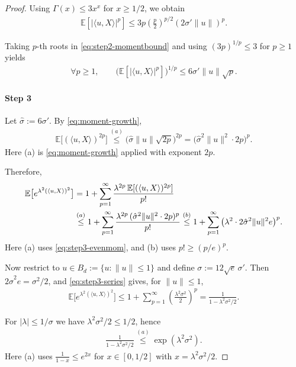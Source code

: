 \documentclass[10pt]{article}
\begin{document}
\begin{proof}
Using $\Gamma(x)\le 3x^x$ for $x\ge 1/2$, we obtain
\begin{align}
\mathbb{E}[|\langle u,X\rangle|^p]
\le
3p\left(\frac{p}{2}\right)^{p/2}(2\sigma'\|u\|)^p .
\label{eq:step2-momentbound}
\end{align}


Taking $p$-th roots in \eqref{eq:step2-momentbound} and using $(3p)^{1/p}\le 3$ for $p\ge1$ yields
\begin{align}
\forall p\ge1,\qquad
\big(\mathbb{E}[|\langle u,X\rangle|^p]\big)^{1/p}
\le 6\sigma'\|u\|\sqrt{p}.
\label{eq:moment-growth}
\end{align}


\paragraph{Step 3}
Let $\hat{\sigma}:=6\sigma'$. By \eqref{eq:moment-growth},
\begin{align}
\mathbb{E}\big[(\langle u,X\rangle)^{2p}\big]
\overset{(a)}{\le}
\big(\hat{\sigma}\|u\|\sqrt{2p}\big)^{2p}
=
\big(\hat{\sigma}^2\|u\|^2\cdot 2p\big)^p .
\label{eq:step3-evenmom}
\end{align}
Here (a) is \eqref{eq:moment-growth} applied with exponent $2p$.

Therefore,
\begin{align}
\mathbb{E}\big[e^{\lambda^2(\langle u,X\rangle)^2}\big]
&=
1+\sum_{p=1}^\infty
\frac{\lambda^{2p}\,\mathbb{E}[(\langle u,X\rangle)^{2p}]}{p!}
\notag\\
&\overset{(a)}{\le}
1+\sum_{p=1}^\infty
\frac{\lambda^{2p}\,(\hat{\sigma}^2\|u\|^2\cdot 2p)^p}{p!}
\overset{(b)}{\le}
1+\sum_{p=1}^\infty
\big(\lambda^2\cdot 2\hat{\sigma}^2\|u\|^2 e\big)^p .
\label{eq:step3-series}
\end{align}
Here (a) uses \eqref{eq:step3-evenmom}, and (b) uses $p!\ge (p/e)^p$.

Now restrict to $u\in B_d:=\{u:\|u\|\le 1\}$ and define $\sigma:=12\sqrt{e}\,\sigma'$.
Then $2\hat{\sigma}^2 e=\sigma^2/2$, and \eqref{eq:step3-series} gives, for $\|u\|\le 1$,
\begin{align}
\mathbb{E}\big[e^{\lambda^2(\langle u,X\rangle)^2}\big]
\le
1+\sum_{p=1}^\infty \left(\frac{\lambda^2\sigma^2}{2}\right)^p
=
\frac{1}{1-\lambda^2\sigma^2/2}.
\label{eq:step3-geom}
\end{align}

For $|\lambda|\le 1/\sigma$ we have $\lambda^2\sigma^2/2\le 1/2$, hence
\begin{align}
\frac{1}{1-\lambda^2\sigma^2/2}
\overset{(a)}{\le}
\exp(\lambda^2\sigma^2).
\label{eq:step3-final}
\end{align}
Here (a) uses $\frac{1}{1-x}\le e^{2x}$ for $x\in[0,1/2]$ with $x=\lambda^2\sigma^2/2$.


\end{proof}
\end{document}
